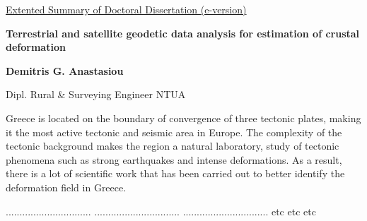 \begin{extsum}

\graphicspath{{Chapter4/Figs/Vector/}{Chapter4/Figs/}{Chapter5/Figs/Vector/}{Chapter6/Figs/Vector1/}{Chapter7/Figs/Vector/}}

  \begin{center}
  	{\normalsize \underline{Extented Summary of Doctoral Dissertation (e-version)} \par}
    { \Large {\bfseries {Terrestrial and satellite geodetic data analysis for estimation of crustal deformation}} \par}
    {\large \vspace*{1em} {\bfseries {Demitris G. Anastasiou}} \par}
    {\normalsize {Dipl. Rural \& Surveying Engineer NTUA} \par}
  \end{center}

  \let\thefootnote\relax{}
  \let\thefootnote\relax{}
  \let\thefootnote\relax{}


Greece is located on the boundary of convergence of three tectonic plates, making it the most active tectonic and seismic area in Europe. The complexity of the tectonic background makes the region a natural laboratory, study of tectonic phenomena such as strong earthquakes and intense deformations. As a result, there is a lot of scientific work that has been carried out to better identify the deformation field in Greece.

...............................
...............................
...............................
etc etc etc

\end{extsum}
